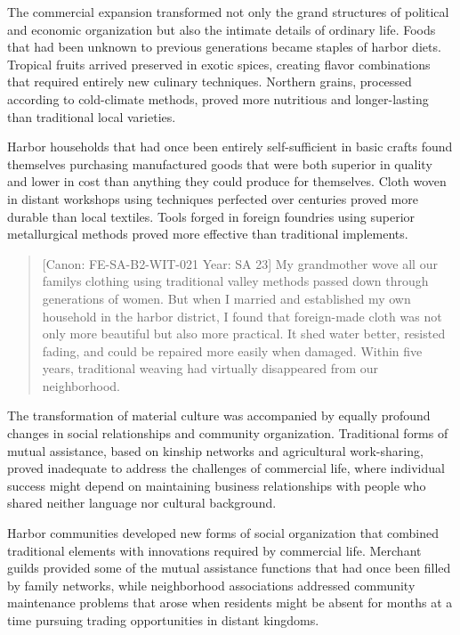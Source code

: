 The commercial expansion transformed not only the grand structures of
political and economic organization but also the intimate details of
ordinary life. Foods that had been unknown to previous generations
became staples of harbor diets. Tropical fruits arrived preserved in
exotic spices, creating flavor combinations that required entirely new
culinary techniques. Northern grains, processed according to
cold-climate methods, proved more nutritious and longer-lasting than
traditional local varieties.

Harbor households that had once been entirely self-sufficient in basic
crafts found themselves purchasing manufactured goods that were both
superior in quality and lower in cost than anything they could produce
for themselves. Cloth woven in distant workshops using techniques
perfected over centuries proved more durable than local textiles. Tools
forged in foreign foundries using superior metallurgical methods proved
more effective than traditional implements.

\begin{quote}
{[}Canon: FE-SA-B2-WIT-021 \textbar{} Year: SA 23{]} My grandmother wove
all our family\textquotesingle s clothing using traditional valley
methods passed down through generations of women. But when I married and
established my own household in the harbor district, I found that
foreign-made cloth was not only more beautiful but also more practical.
It shed water better, resisted fading, and could be repaired more easily
when damaged. Within five years, traditional weaving had virtually
disappeared from our neighborhood.
\end{quote}

The transformation of material culture was accompanied by equally
profound changes in social relationships and community organization.
Traditional forms of mutual assistance, based on kinship networks and
agricultural work-sharing, proved inadequate to address the challenges
of commercial life, where individual success might depend on maintaining
business relationships with people who shared neither language nor
cultural background.

Harbor communities developed new forms of social organization that
combined traditional elements with innovations required by commercial
life. Merchant guilds provided some of the mutual assistance functions
that had once been filled by family networks, while neighborhood
associations addressed community maintenance problems that arose when
residents might be absent for months at a time pursuing trading
opportunities in distant kingdoms.

